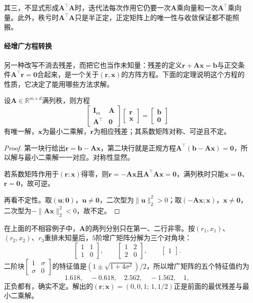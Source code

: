 其三，不显式形成$\bm A^\top\bm A$时，迭代法每次作用它仍要一次$\bm A$乘向量和一次$\bm A^\top$乘向量。此外，秩亏时$\bm A^\top\bm A$只是半正定，正定矩阵上的唯一性与收敛保证都不能照搬。

\paragraph{经增广方程转换}
另一种改写不消去残差，而把它也当作未知量：残差的定义$\bm r+\bm A\bm x=\bm b$与正交条件$\bm A^\top\bm r=\bm0$合起来，是一个关于$(\bm r,\bm x)$的方阵方程。下面的定理说明这个方程的性质，它决定了能用哪些方法求解。

\begin{theorem}[最小二乘的增广方程]
\label{thm:ls-augmented-kkt-system}
设$\bm A\in\mathbb R^{m\times d}$满列秩，则方程
\begin{equation}
 \begin{bmatrix}\bm I_m&\bm A\\ \bm A^\top&\bm0\end{bmatrix}
 \begin{bmatrix}\bm r\\ \bm x\end{bmatrix}
 =\begin{bmatrix}\bm b\\ \bm0\end{bmatrix}
 \label{eq:ls-augmented-kkt-system}
\end{equation}
有唯一解，$\bm x$为最小二乘解，$\bm r$为相应残差；其系数矩阵对称、可逆且不定。
\end{theorem}
\begin{proof}
第一块行给出$\bm r=\bm b-\bm A\bm x$，第二块行就是正规方程$\bm A^\top(\bm b-\bm A\bm x)=\bm0$，所以解与最小二乘解一一对应。对称性显然。

若系数矩阵作用于$(\bm r;\bm x)$得零，则$\bm r=-\bm A\bm x$且$\bm A^\top\bm A\bm x=\bm0$，满列秩时只能$\bm x=\bm0$、$\bm r=\bm0$，故可逆。

再看不定性。取$(\bm u;\bm0)$，$\bm u\ne\bm0$，二次型为$\lVert\bm u\rVert_2^2>0$；取$(-\bm A\bm x;\bm x)$，$\bm x\ne\bm0$，二次型为$-\lVert\bm A\bm x\rVert_2^2<0$，故不定。
\end{proof}

在上面的不相容例子中，$\bm A$的两列分别只在第一、二行非零。按$(r_1,x_1)$、$(r_2,x_2)$、$r_3$重排未知量后，$5$阶增广矩阵分解为三个对角块：
\[
 \begin{bmatrix}1&1\\1&0\end{bmatrix},\qquad
 \begin{bmatrix}1&2\\2&0\end{bmatrix},\qquad
 \begin{bmatrix}1\end{bmatrix}.
\]
二阶块$\left[\begin{smallmatrix}1&\sigma\\\sigma&0\end{smallmatrix}\right]$的特征值是$(1\pm\sqrt{1+4\sigma^2})/2$，所以增广矩阵的五个特征值约为
\[
 1.618,\quad -0.618,\quad 2.562,\quad -1.562,\quad 1,
\]
正负都有，确实不定。解出的$(\bm r;\bm x)=(0,0,1;\,1,1/2)$正是前面的最优残差与最小二乘解。

